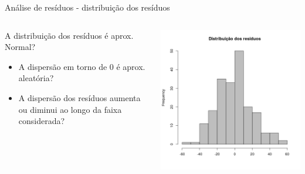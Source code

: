 \documentclass{beamer}
\begin{document}
\begin{frame}{\footnotesize Análise de resíduos - distribuição dos resíduos}
  \begin{columns}
    \begin{column}{5cm}
      A distribuição dos resíduos é aprox. Normal?
      \bigskip
      \begin{itemize}
        \footnotesize
      \item A dispersão em torno de 0 é aprox. aleatória?
        \bigskip
      \item A dispersão dos resíduos aumenta ou diminui ao longo da faixa considerada?
      \end{itemize}
    \end{column}
    \begin{column}{5cm}
      \begin{center}
        \includegraphics[width=1.1\textwidth]{Cap18-19/pratica-hist-resid}
      \end{center}
    \end{column}
  \end{columns}
\end{frame}
\end{document}
